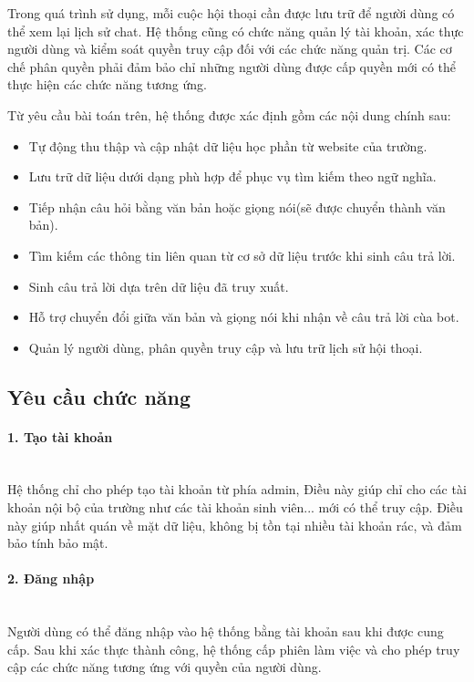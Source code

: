 \documentclass[../DoAn.tex]{subfiles}
\begin{document}
Trong quá trình sử dụng, mỗi cuộc hội thoại cần được lưu trữ để người dùng có thể xem lại lịch sử chat. Hệ thống cũng có chức năng quản lý tài khoản, xác thực người dùng và kiểm soát quyền truy cập đối với các chức năng quản trị. Các cơ chế phân quyền phải đảm bảo chỉ những người dùng được cấp quyền mới có thể thực hiện các chức năng tương ứng.

Từ yêu cầu bài toán trên, hệ thống được xác định gồm các nội dung chính sau:
\begin{itemize}
    \item Tự động thu thập và cập nhật dữ liệu học phần từ website của trường.
    \item Lưu trữ dữ liệu dưới dạng phù hợp để phục vụ tìm kiếm theo ngữ nghĩa.
    \item Tiếp nhận câu hỏi bằng văn bản hoặc giọng nói(sẽ được chuyển thành văn bản).
    \item Tìm kiếm các thông tin liên quan từ cơ sở dữ liệu trước khi sinh câu trả lời.
    \item Sinh câu trả lời dựa trên dữ liệu đã truy xuất.
    \item Hỗ trợ chuyển đổi giữa văn bản và giọng nói khi nhận về câu trả lời cùa bot.
    \item Quản lý người dùng, phân quyền truy cập và lưu trữ lịch sử hội thoại.
\end{itemize}

\subsection{Yêu cầu chức năng}
\paragraph{1. Tạo tài khoản}\leavevmode\\
\hspace*{1em}Hệ thống chỉ cho phép tạo tài khoản từ phía admin, Điều này giúp chỉ cho các tài khoản nội bộ của trường như các tài khoản sinh viên... mới có thể truy cập. Điều này giúp nhất quán về mặt dữ liệu, không bị tồn tại nhiều tài khoản rác, và đảm bảo tính bảo mật.

\paragraph{2. Đăng nhập}\leavevmode\\
\hspace*{1em}Người dùng có thể đăng nhập vào hệ thống bằng tài khoản sau khi được cung cấp. Sau khi xác thực thành công, hệ thống cấp phiên làm việc và cho phép truy cập các chức năng tương ứng với quyền của người dùng.
\end{document}
